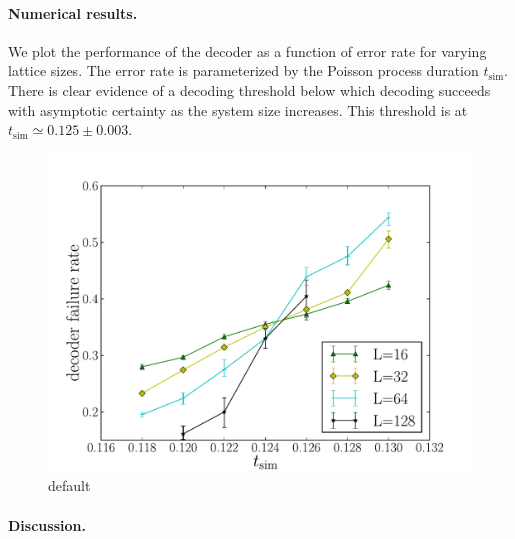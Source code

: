 \documentclass[aps, prl, letterpaper, twocolumn, superscriptaddress, notitlepage]{revtex4-1}
\begin{document}
\paragraph{Numerical results.}

We plot the performance of the decoder as a function of error rate for varying lattice sizes. The error rate is parameterized by the Poisson process duration $t_{\mathrm{sim}}$. There is clear evidence of a decoding threshold below
which decoding succeeds with asymptotic certainty as the system size increases. This threshold is at $t_{\mathrm{sim}}\simeq 0.125 \pm 0.003.$

\begin{figure}[th!]
\begin{center}
	\includegraphics[width=\columnwidth]{anyons-kyle.pdf}
\caption{default}
\label{default}
\end{center}
\end{figure}


	

\paragraph{Discussion.}
\end{document}
